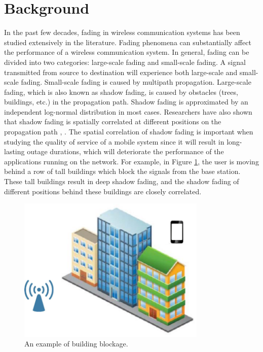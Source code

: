\section{Background}
In the past few decades, fading in wireless communication systems has been studied extensively in the literature. Fading phenomena can substantially affect the performance of a wireless communication system. In general, fading can be divided into two categories: large-scale fading and small-scale fading. A signal transmitted from source to destination will experience both large-scale and small-scale fading. Small-scale fading is caused by multipath propagation. Large-scale fading, which is also known as shadow fading, is caused by obstacles (trees, buildings, etc.) in the propagation path. Shadow fading is approximated by an independent log-normal distribution \cite{rappaport1996wireless} in most cases. Researchers have also shown that shadow fading is spatially correlated at different positions on the propagation path \cite{gudmundson1991correlation}, \cite{zhang2008novel}. The spatial correlation of shadow fading is important when studying the quality of service of a mobile system since it will result in long-lasting outage durations, which will deteriorate the performance of the applications running on the network. For example, in Figure \ref{building2}, the user is moving behind a row of tall buildings which block the signals from the base station. These tall buildings result in deep shadow fading, and the shadow fading of different positions behind these buildings are closely correlated.
\begin{figure}
\centering
\includegraphics[width=9cm]{building.eps}
\caption{An example of building blockage.}
\label{building2}
\end{figure}

